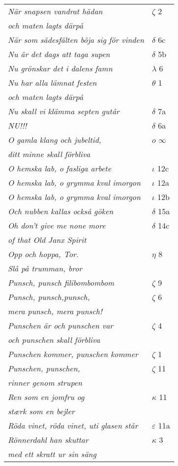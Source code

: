 \documentclass[a6paper,10pt]{article}
\begin{document}
\newpage
\begin{table}[!h]
\begin{tabular}{l l}
\textit{När snapsen vandrat hädan}	&$\zeta$ 2\\
\textit{och maten lagts därpå} &\\
\textit{När som sädesfälten böja sig för vinden}	&$\delta$ 6c\\
\textit{Nu är det dags att taga supen}	&$\delta$ 5b\\
\textit{Nu grönskar det i dalens famn}	&$\lambda$ 6\\
\textit{Nu har alla lämnat festen}	&$\theta$ 1\\
\textit{och maten lagts därpå} &\\
\textit{Nu skall vi klämma septen gutår}	&$\delta$ 7a\\
\textit{NU!!!}	&$\delta$ 6a\\
\textit{O gamla klang och jubeltid,}	&$o$ $\infty$\\
\textit{ditt minne skall förbliva} &\\
\textit{O hemska lab, o fasliga arbete}	&$\iota$ 12c\\
\textit{O hemska lab, o grymma kval imorgon}	&$\iota$ 12a\\
\textit{O hemska lab, o grymma kval imorgon}	&$\iota$ 12b\\
\textit{Och nubben kallas också göken}	&$\delta$ 15a\\
\textit{Oh don't give me none more}	&$\delta$ 14c\\
\textit{of that Old Janx Spirit} &\\
\textit{Opp och hoppa, Tor.}	&$\eta$ 8\\
\textit{Slå på trumman, bror} &\\
\textit{Punsch, punsch filibombombom}	&$\zeta$ 9\\
\textit{Punsch, punsch,punsch,}	&$\zeta$ 6\\
\textit{mera punsch, mera punsch!} &\\
\textit{Punschen är och punschen var}	&$\zeta$ 4\\
\textit{och punschen skall förbliva} &\\
\textit{Punschen kommer, punschen kommer}	&$\zeta$ 1\\
\textit{Punschen, punschen,}	&$\zeta$ 11\\
\textit{rinner genom strupen} &\\
\textit{Ren som en jomfru og}	&$\kappa$ 11\\
\textit{stærk som en bejler} &\\
\textit{Röda vinet, röda vinet, uti glasen står}	&$\varepsilon$ 11a\\
\textit{Rönnerdahl han skuttar}	&$\kappa$ 3\\
\textit{med ett skratt ur sin säng} &\\
\end{tabular}
\end{table}
\end{document}
